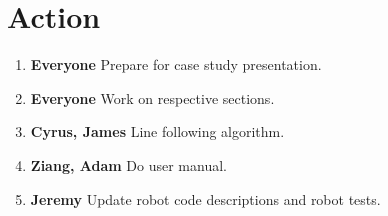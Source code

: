 \documentclass{article}
\begin{document}
\section{Action}
\begin{enumerate}
\item \textbf{Everyone} Prepare for case study presentation.
\item \textbf{Everyone} Work on respective sections.
\item \textbf{Cyrus, James} Line following algorithm.
\item \textbf{Ziang, Adam} Do user manual.
\item \textbf{Jeremy} Update robot code descriptions and robot tests.
\end{enumerate}
\end{document}
